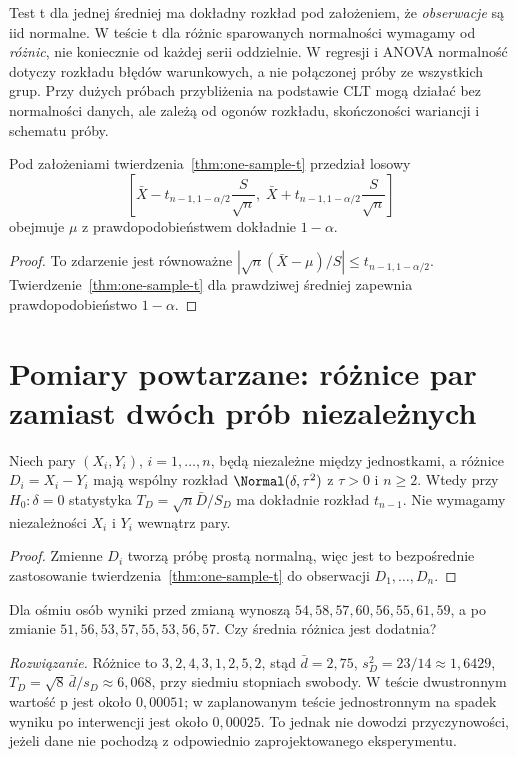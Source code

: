 \begin{uwaga}
Test t dla jednej średniej ma dokładny rozkład pod
założeniem, że \emph{obserwacje} są iid normalne. W teście t dla
różnic sparowanych normalności wymagamy od \emph{różnic}, nie
koniecznie od każdej serii oddzielnie. W regresji i ANOVA
normalność dotyczy rozkładu błędów warunkowych, a nie połączonej
próby ze wszystkich grup. Przy dużych próbach przybliżenia
na podstawie CLT mogą działać bez normalności danych, ale
zależą od ogonów rozkładu, skończoności wariancji i schematu
próby.
\end{uwaga}

\begin{stwierdzenie}
Pod założeniami twierdzenia~\ref{thm:one-sample-t}
przedział losowy
\[
 \left[\bar X-t_{n-1,1-\alpha/2}\frac S{\sqrt n},\;
 \bar X+t_{n-1,1-\alpha/2}\frac S{\sqrt n}\right]
\]
obejmuje $\mu$ z prawdopodobieństwem dokładnie $1-\alpha$.
\end{stwierdzenie}
\begin{proof}
To zdarzenie jest równoważne
$|\sqrt n(\bar X-\mu)/S|\le t_{n-1,1-\alpha/2}$.
Twierdzenie~\ref{thm:one-sample-t} dla prawdziwej średniej
zapewnia prawdopodobieństwo $1-\alpha$.
\end{proof}

\section{Pomiary powtarzane: różnice par zamiast dwóch prób niezależnych}
\begin{twierdzenie}\label{thm:paired-t}
Niech pary $(X_i,Y_i)$, $i=1,\ldots,n$, będą niezależne
między jednostkami, a różnice $D_i=X_i-Y_i$ mają wspólny
rozkład $\Normal(\delta,\tau^2)$ z $\tau>0$ i $n\ge2$.
Wtedy przy $H_0:\delta=0$ statystyka
$T_D=\sqrt n\bar D/S_D$ ma dokładnie rozkład $t_{n-1}$.
Nie wymagamy niezależności $X_i$ i $Y_i$ wewnątrz pary.
\end{twierdzenie}
\begin{proof}
Zmienne $D_i$ tworzą próbę prostą normalną, więc jest to
bezpośrednie zastosowanie twierdzenia~\ref{thm:one-sample-t}
do obserwacji $D_1,\ldots,D_n$.
\end{proof}

\begin{zadanie}
Dla ośmiu osób wyniki przed zmianą wynoszą
$54,58,57,60,56,55,61,59$, a po zmianie
$51,56,53,57,55,53,56,57$. Czy średnia różnica jest dodatnia?
\par\emph{Rozwiązanie.} Różnice to
$3,2,4,3,1,2,5,2$, stąd
$\bar d=2{,}75$, $s_D^2=23/14\approx1{,}6429$,
$T_D=\sqrt8\,\bar d/s_D\approx6{,}068$,
przy siedmiu stopniach swobody. W teście dwustronnym
wartość p jest około $0{,}00051$; w zaplanowanym teście
jednostronnym na spadek wyniku po interwencji jest około
$0{,}00025$. To jednak nie dowodzi przyczynowości, jeżeli
dane nie pochodzą z odpowiednio zaprojektowanego eksperymentu.
\end{zadanie}

